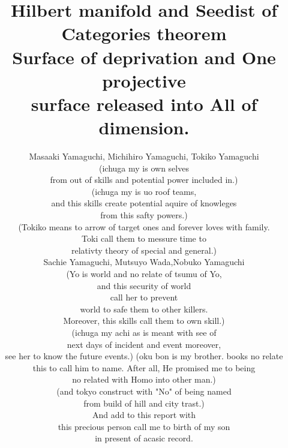 \documentclass{jsarticle}
\begin{document}
\title{Hilbert manifold and Seedist of Categories theorem \\
Surface of deprivation and One projective \\
surface released into All of dimension.}
\author{Masaaki Yamaguchi, Michihiro Yamaguchi, Tokiko Yamaguchi \\
(ichuga my is own selves \\
from out of skills and potential power included in.) \\
(ichuga my is uo roof teams, \\
and this skills create potential aquire of knowleges \\
from this safty powers.) \\
(Tokiko means to arrow of target ones and forever loves with family. \\
Toki call them to messure time to \\ 
relativty theory of special and general.) \\
Sachie Yamaguchi, Mutsuyo Wada,Nobuko Yamaguchi \\
(Yo is world and no relate of tsumu of Yo, \\
and this security of world \\
call her to prevent \\
world to safe them to other killers. \\
Moreover, this skills call them to own skill.) \\
(ichuga my achi as is meant with see of \\
next days of incident and event moreover, \\
see her to know the future events.)
(oku bon is my brother. books no relate \\
this to call him to name.
After all, He promised me to being \\
no related with Homo into other man.) \\
(and tokyo construct with "No" of being named \\
from build of hill and city trast.) \\
And add to this report with \\
this precious person call me to birth of my son \\
in present of acasic record.}
\date{}
\maketitle
\end{document}
